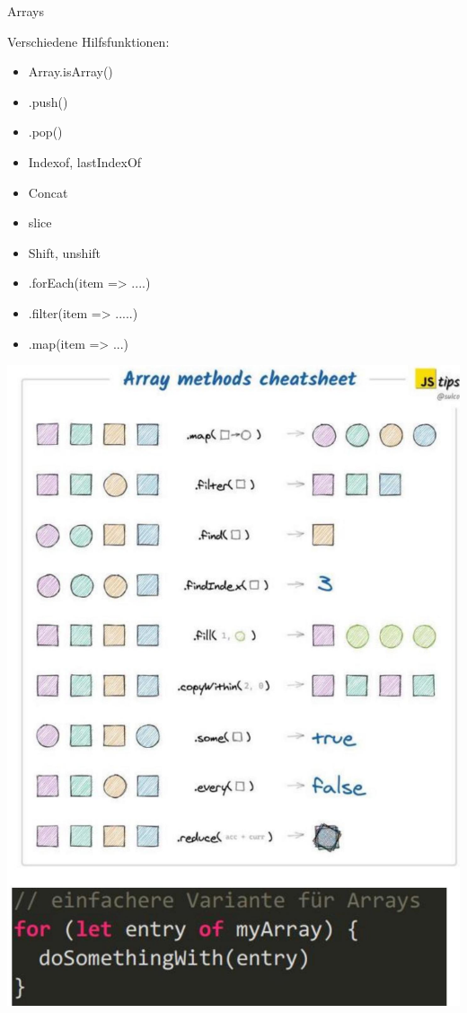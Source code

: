 \begin{code}{Arrays}

    Verschiedene Hilfsfunktionen:
    \begin{itemize}
        \item Array.isArray()
        \item .push()
        \item .pop()
        \item Indexof, lastIndexOf
        \item Concat
        \item slice
        \item Shift, unshift
        \item .forEach(item => ....)
        \item .filter(item => .....)
        \item .map(item => ...)
    \end{itemize}
    \includegraphics[width=\linewidth]{images/2024_12_29_858f09cde51177c71657g-08}
\end{code}
 
